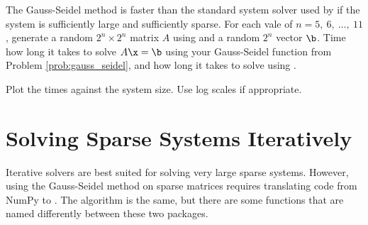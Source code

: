 \begin{problem} %
The Gauss-Seidel method is faster than the standard system solver used by  if the system is sufficiently large and sufficiently sparse.
For each vale of $n=5,\ 6,\ \ldots,\ 11$, generate a random $2^n \times 2^n$ matrix $A$ using  and a random $2^n$ vector $\b$.
Time how long it takes to solve $A\x = \b$ using your Gauss-Seidel function from Problem \ref{prob:gauss_seidel}, and how long it takes to solve using .

Plot the times against the system size.
Use log scales if appropriate.
\end{problem}

\section*{Solving Sparse Systems Iteratively} %

Iterative solvers are best suited for solving very large sparse systems.
However, using the Gauss-Seidel method on sparse matrices requires translating code from NumPy to .
The algorithm is the same, but there are some functions that are named differently between these two packages.

